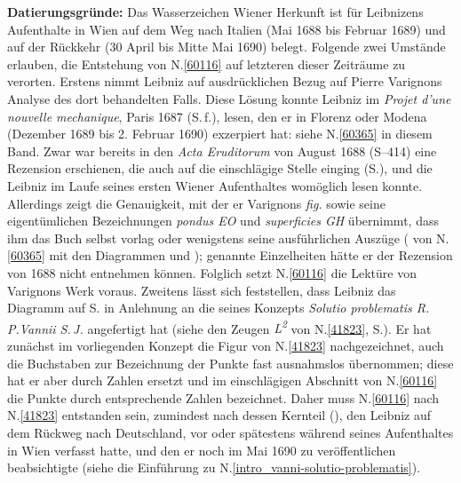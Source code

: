 \begin{ledgroup}
\footnotesize
\pstart
\noindent
\textbf{Datierungsgründe:}
Das Wasserzeichen Wiener Herkunft ist für Leibnizens Aufenthalte in Wien auf dem Weg nach Italien (Mai 1688 bis Februar 1689) und auf der Rückkehr (30 April bis Mitte Mai 1690) belegt.
Folgende zwei Umstände erlauben, die Entstehung von N.\;\ref{60116} auf letzteren dieser Zeiträume zu verorten.
\pend
\pstart
Erstens 
nimmt Leibniz auf  ausdrücklichen Bezug auf 
Pierre Varignons 
Analyse des dort behandelten Falls.
Diese Lösung konnte Leibniz im \cite{02028}\textit{Projet d'une nouvelle mechanique}, Paris 1687 (S.\,f.), lesen, den er in Florenz oder Modena (Dezember 1689 bis 2. Februar 1690) exzerpiert hat: siehe N.\;\ref{60365} in diesem Band. 
Zwar war bereits in den \cite{01023}\textit{Acta Eruditorum} von August 1688 (S--414) eine \cite{02166}Rezension erschienen, die auch auf die einschlägige Stelle  einging (S.), und die Leibniz im Laufe seines ersten Wiener Aufenthaltes womöglich lesen konnte.
Allerdings zeigt
die Genauigkeit, mit der er Varignons \textit{fig.} sowie seine eigentümlichen Bezeichnungen \textit{pondus EO} und \textit{superficies GH} übernimmt,
dass ihm das Buch selbst vorlag oder wenigstens seine ausführlichen Auszüge ( von N.\;\ref{60365} mit den Diagrammen  und ); genannte Einzelheiten hätte er der Rezension von 1688 nicht entnehmen können.
Folglich setzt N.\;\ref{60116} die Lektüre von Varignons Werk voraus.
\pend
\pstart
Zweitens lässt sich feststellen, dass Leibniz das Diagramm  auf S.\;\pageref{Fig:35_10_14_009-010_Fig-7} 
in Anlehnung an die  seines Konzepts \textit{Solutio problematis R.\,P.\;Vannii S.\,J.}
angefertigt hat (siehe den Zeugen \textit{L\textsuperscript{2}} von N.\;\ref{41823}, S.\;\pageref{Fig:35_10_13_010-011_Fig-4}).
Er hat zunächst im vorliegenden Konzept die Figur von N.\;\ref{41823} nachgezeichnet, auch die Buchstaben zur Bezeichnung der Punkte fast ausnahmslos übernommen; diese hat er aber durch Zahlen ersetzt und im einschlägigen Abschnitt von N.\;\ref{60116} die Punkte durch entsprechende Zahlen bezeichnet.
Daher muss N.\;\ref{60116} nach N.\;\ref{41823} entstanden sein,
zumindest nach dessen Kernteil (), den Leibniz auf dem Rückweg nach Deutschland, vor oder spätestens während seines Aufenthaltes in Wien verfasst hatte, und den er noch im Mai 1690 zu veröffentlichen beabsichtigte (siehe die Einführung zu N.\;\ref{intro_vanni-solutio-problematis}).
\pend 
\end{ledgroup}
